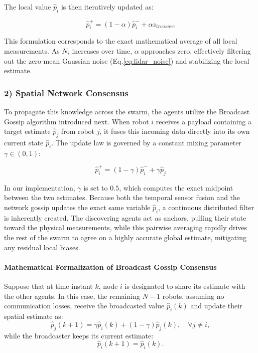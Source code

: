 \documentclass[times, twoside]{zHenriquesLab-StyleBioRxiv}
\begin{document}
The local value $\hat{p}_i$ is then iteratively updated as:

\begin{equation}
    \hat{p}_i^+ = (1-\alpha)\hat{p}_i^- + \alpha z_{treasure}
    \label{eq:temporal_filter}
\end{equation}

This formulation corresponds to the exact mathematical average of all local measurements. As $N_i$ increases over time, $\alpha$ approaches zero, effectively filtering out the zero-mean Gaussian noise (Eq.\ref{eq:lidar_noise}) and stabilizing the local estimate.

\subsubsection*{2) Spatial Network Consensus}
To propagate this knowledge across the swarm, the agents utilize the Broadcast Gossip algorithm introduced next. When robot $i$ receives a payload containing a target estimate $\hat{p}_j$ from robot $j$, it fuses this incoming data directly into its own current state $\hat{p}_i$. The update law is governed by a constant mixing parameter $\gamma \in (0,1)$:

\begin{equation}
    \hat{p}_i^+ = (1-\gamma)\hat{p}_i^- + \gamma \hat{p}_j
    \label{eq:spatial_filter}
\end{equation}

In our implementation, $\gamma$ is set to $0.5$, which computes the exact midpoint between the two estimates. Because both the temporal sensor fusion and the network gossip updates the exact same variable $\hat{p}_i$, a continuous distributed filter is inherently created. The discovering agents act as anchors, pulling their state toward the physical measurements, while this pairwise averaging rapidly drives the rest of the swarm to agree on a highly accurate global estimate, mitigating any residual local biases.

\paragraph{Mathematical Formalization of Broadcast Gossip Consensus}
Suppose that at time instant $k$, node $i$ is designated to share its estimate with the other agents. In this case, the remaining $N - 1$ robots, assuming no communication losses, receive the broadcasted value $\hat{p}_i(k)$ and update their spatial estimate as:
\begin{equation}
    \hat{p}_j(k+1) = \gamma \hat{p}_i(k) + (1-\gamma)\hat{p}_j(k), \quad \forall j \neq i,
\end{equation}
while the broadcaster keeps its current estimate:
\begin{equation}
    \hat{p}_i(k+1) = \hat{p}_i(k).
\end{equation}
\end{document}
